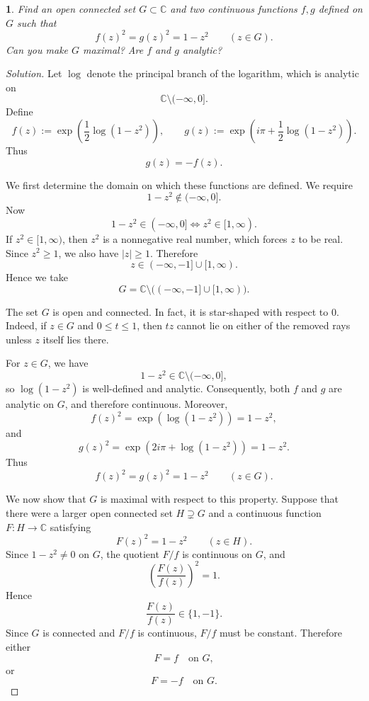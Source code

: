 \documentclass[12pt, a4paper]{report}
\theoremstyle{spaced}
\newtheorem{exercise}{}
\newcommand{\setexercise}[1]{\setcounter{exercise}{#1-1}}
\DeclareMathOperator{\Log}{log}
\begin{document}
\setexercise{16}
\begin{exercise}
	Find an open connected set \(G\subset\mathbb{C}\) and two continuous functions \(f,g\) defined on \(G\) such that
	\[
		f(z)^2=g(z)^2=1-z^2\qquad(z\in G).
	\]
	Can you make \(G\) maximal? Are \(f\) and \(g\) analytic?
\end{exercise}


\begin{proof}[Solution]
	Let \(\Log\) denote the principal branch of the logarithm, which is analytic on
	\[
		\mathbb{C}\setminus(-\infty,0].
	\]
	Define
	\[
		f(z):=\exp\!\left(\frac12\Log(1-z^2)\right),
		\qquad
		g(z):=\exp\!\left(i\pi+\frac12\Log(1-z^2)\right).
	\]
	Thus
	\[
		g(z)=-f(z).
	\]

	We first determine the domain on which these functions are defined. We require
	\[
		1-z^2\notin(-\infty,0].
		\]
		Now
		\[
		1-z^2\in(-\infty,0]
			\iff z^2\in[1,\infty).
		\]
		If \(z^2\in[1,\infty)\), then \(z^2\) is a nonnegative real number, which
				forces \(z\) to be real. Since \(z^2\ge1\), we also have \(|z|\ge1\).
				Therefore
				\[
				z\in(-\infty,-1]\cup[1,\infty).
	\]
	Hence we take
	\[
		G
		=
		\mathbb{C}\setminus\bigl((-\infty,-1]\cup[1,\infty)\bigr).
			\]

			The set \(G\) is open and connected. In fact, it is star-shaped with respect
			to \(0\). Indeed, if \(z\in G\) and \(0\le t\le1\), then \(tz\) cannot lie on
			either of the removed rays unless \(z\) itself lies there.

			For \(z\in G\), we have
			\[
			1-z^2\in\mathbb{C}\setminus(-\infty,0],
	\]
	so \(\Log(1-z^2)\) is well-defined and analytic. Consequently, both \(f\) and
	\(g\) are analytic on \(G\), and therefore continuous.
	Moreover,
	\[
		f(z)^2
		=
		\exp\!\left(\Log(1-z^2)\right)
		=
		1-z^2,
	\]
	and
	\[
		g(z)^2
		=
		\exp\!\left(2i\pi+\Log(1-z^2)\right)
		=
		1-z^2.
	\]
	Thus
	\[
		f(z)^2=g(z)^2=1-z^2
		\qquad (z\in G).
	\]

	We now show that \(G\) is maximal with respect to this property.
	Suppose that there were a larger open connected set \(H\supsetneq G\) and a
	continuous function \(F:H\to\mathbb{C}\) satisfying
	\[
		F(z)^2=1-z^2
		\qquad (z\in H).
	\]
	Since \(1-z^2\neq0\) on \(G\), the quotient \(F/f\) is continuous on \(G\), and
	\[
		\left(\frac{F(z)}{f(z)}\right)^2=1.
	\]
	Hence
	\[
		\frac{F(z)}{f(z)}\in\{1,-1\}.
	\]
	Since \(G\) is connected and \(F/f\) is continuous, \(F/f\) must be constant.
	Therefore either
	\[
		F=f \quad\text{on }G,
	\]
	or
	\[
		F=-f \quad\text{on }G.
	\]


\end{proof}
\end{document}
